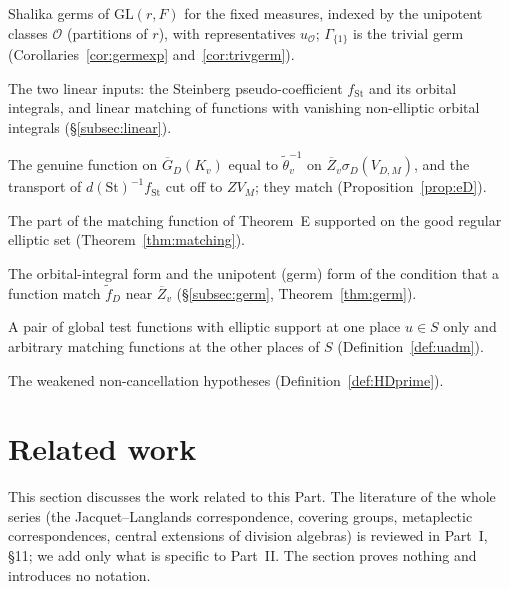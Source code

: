 \documentclass[12pt]{article}
\newcommand{\ov}[1]{\overline{#1}}
\newcommand{\reg}{\mathrm{reg}}
\newcommand{\GL}{\mathrm{GL}}
\newcommand{\St}{\mathrm{St}}
\newcommand{\Zb}{\ov{Z}}
\newcommand{\GDb}{\ov{G}_D}
\newcommand{\sg}{\sigma}
\theoremstyle{plain}
\theoremstyle{definition}
\begin{document}
\begin{description}[style=nextline,leftmargin=1.5em]
\item[$\Gamma_{\mathcal O}$, $u_{\mathcal O}$] Shalika germs of $\GL(r,F)$ for the fixed measures, indexed by the unipotent classes $\mathcal O$ (partitions of $r$), with representatives $u_{\mathcal O}$; $\Gamma_{\{1\}}$ is the trivial germ (Corollaries~\ref{cor:germexp} and~\ref{cor:trivgerm}).
\item[(L1), (L2); $f_{\St}$] The two linear inputs: the Steinberg pseudo-coefficient $f_{\St}$ and its orbital integrals, and linear matching of functions with vanishing non-elliptic orbital integrals (\S\ref{subsec:linear}).
\item[$e_D$, $\tilde f^{\St}$] The genuine function on $\GDb(K_v)$ equal to $\tilde\theta_v^{-1}$ on $\Zb_v\sg_D(V_{D,M})$, and the transport of $d(\St)^{-1}f_{\St}$ cut off to $ZV_M$; they match (Proposition~\ref{prop:eD}).
\item[$\tilde f_{\reg}$] The part of the matching function of Theorem~E supported on the good regular elliptic set (Theorem~\ref{thm:matching}).
\item[(Ell), (Non); (G1), (G2)] The orbital-integral form and the unipotent (germ) form of the condition that a function match $\tilde f_D$ near $\Zb_v$ (\S\ref{subsec:germ}, Theorem~\ref{thm:germ}).
\item[$u$-admissible pair] A pair of global test functions with elliptic support at one place $u\in S$ only and arbitrary matching functions at the other places of $S$ (Definition~\ref{def:uadm}).
\item[$(\mathrm H_D')$, $(\mathrm H')$] The weakened non-cancellation hypotheses (Definition~\ref{def:HDprime}).
\end{description}

\section{Related work}\label{sec:lit}
This section discusses the work related to this Part. The literature of the whole series (the Jacquet--Langlands correspondence, covering groups, metaplectic correspondences, central extensions of division algebras) is reviewed in Part~I, \S11; we add only what is specific to Part~II. The section proves nothing and introduces no notation.
\end{document}
